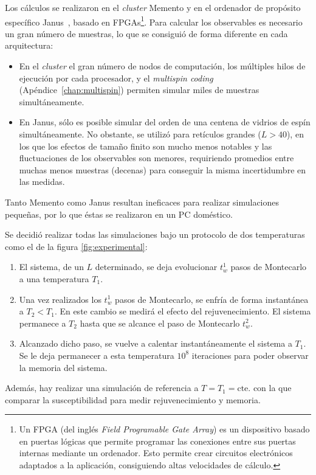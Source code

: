 \documentclass[11pt]{report}
\begin{document}
Los cálculos se realizaron en el \textit{cluster} Memento y en el
ordenador de propósito específico Janus~\cite{janus}, basado en
FPGAs\footnote{Un FPGA (del inglés \textit{Field Programable Gate
    Array}) es un dispositivo basado en puertas lógicas que permite
  programar las conexiones entre sus puertas internas mediante un
  ordenador. Esto permite crear circuitos electrónicos adaptados a la
  aplicación, consiguiendo altas velocidades de cálculo.}. Para
calcular los observables es necesario un gran número de
muestras, lo que se consiguió de forma diferente en cada arquitectura:
\begin{itemize}
\item En el \textit{cluster} el gran número de nodos de computación,
  los múltiples hilos de ejecución por cada procesador, y el
  \textit{multispin coding}~\cite{onetruemultispincoding}
  (Apéndice~\ref{chap:multispin}) permiten simular miles de muestras
  simultáneamente.
\item En Janus, sólo es posible simular del orden de una centena de
  vidrios de espín simultáneamente. No obstante, se utilizó para retículos
  grandes ($L>40$), en los que los efectos de tamaño finito son mucho
  menos notables y las fluctuaciones de los observables son menores,
  requiriendo promedios entre muchas menos muestras (decenas) para
  conseguir la misma incertidumbre en las medidas.
\end{itemize}
Tanto Memento como Janus resultan ineficaces para realizar
simulaciones pequeñas, por lo que éstas se realizaron en un PC
doméstico.

Se decidió realizar todas las simulaciones bajo un protocolo
de dos temperaturas como el de la figura \ref{fig:experimental}:
\begin{enumerate}
\item El sistema, de un $L$ determinado, se deja evolucionar $t_w^1$
  pasos de Montecarlo a una temperatura $T_1$.
\item Una vez realizados los $t_w^1$ pasos de Montecarlo, se enfría de
  forma instantánea a $T_2<T_1$. En este cambio se medirá el efecto
  del rejuvenecimiento. El sistema permanece a $T_2$ hasta
  que se alcance el paso de Montecarlo $t_w^2$.
\item Alcanzado dicho paso, se vuelve a calentar instantáneamente el
  sistema a $T_1$. Se le deja permanecer a esta temperatura $10^8$
  iteraciones para poder observar la memoria del sistema.
\end{enumerate}
Además, hay realizar una simulación de referencia a $T=T_1=\text{cte.}$
con la que comparar la susceptibilidad para medir rejuvenecimiento y memoria.
\end{document}
